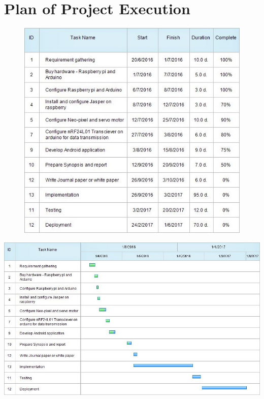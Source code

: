 \documentclass[16pt,oneside,a4paper]{article}
\begin{document}
\section{Plan of Project Execution}
\begin{center}
	\begin{figure}[h]
	\centering 
	\includegraphics[scale=0.7]{gant2.jpg}
	\end{figure}
	
	\includegraphics[scale=0.65]{gant1.jpg}
\end{center}
\end{document}
